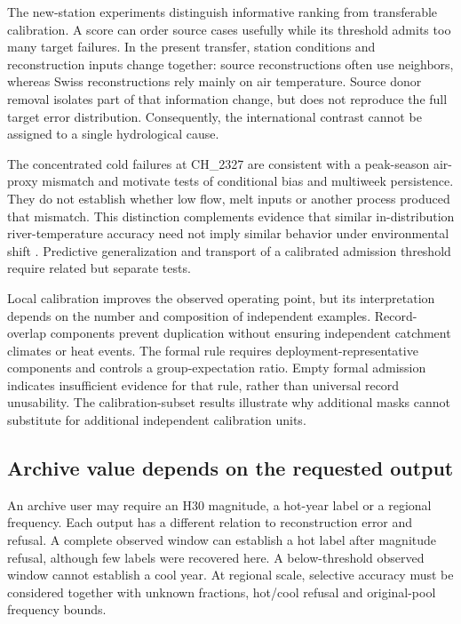 The new-station experiments distinguish informative ranking from transferable calibration. A score can order source cases usefully while its threshold admits too many target failures. In the present transfer, station conditions and reconstruction inputs change together: source reconstructions often use neighbors, whereas Swiss reconstructions rely mainly on air temperature. Source donor removal isolates part of that information change, but does not reproduce the full target error distribution. Consequently, the international contrast cannot be assigned to a single hydrological cause.

The concentrated cold failures at CH\_2327 are consistent with a peak-season air-proxy mismatch and motivate tests of conditional bias and multiweek persistence. They do not establish whether low flow, melt inputs or another process produced that mismatch. This distinction complements evidence that similar in-distribution river-temperature accuracy need not imply similar behavior under environmental shift \cite{topp2023}. Predictive generalization and transport of a calibrated admission threshold require related but separate tests.

Local calibration improves the observed operating point, but its interpretation depends on the number and composition of independent examples. Record-overlap components prevent duplication without ensuring independent catchment climates or heat events. The formal rule requires deployment-representative components and controls a group-expectation ratio. Empty formal admission indicates insufficient evidence for that rule, rather than universal record unusability. The calibration-subset results illustrate why additional masks cannot substitute for additional independent calibration units.

\subsection{Archive value depends on the requested output}

An archive user may require an H30 magnitude, a hot-year label or a regional frequency. Each output has a different relation to reconstruction error and refusal. A complete observed window can establish a hot label after magnitude refusal, although few labels were recovered here. A below-threshold observed window cannot establish a cool year. At regional scale, selective accuracy must be considered together with unknown fractions, hot/cool refusal and original-pool frequency bounds.

